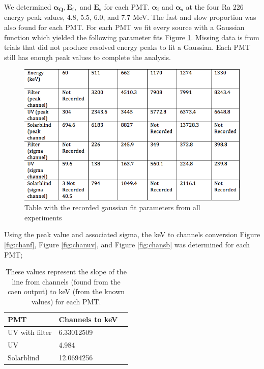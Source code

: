 \documentclass[aip, jmp, amsmath, amssymb, reprint, floatfix]{revtex4-1}
\begin{document}
We determined $\bm{\alpha_Q, E_f,}$ and $\bm{E_s}$ for each PMT. $\bm{\alpha_f}$ and $\bm{\alpha_s}$ at the four Ra 226 energy peak values, 4.8, 5.5, 6.0, and 7.7 MeV. The fast and slow proportion was also found for each PMT. For each PMT we fit every source with a Gaussian function which yielded the following parameter fits Figure \ref{fig:gaussfits}. Missing data is from trials that did not produce resolved energy peaks to fit a Gaussian. Each PMT still has enough peak values to complete the analysis. 

\begin{figure}
  \centering
    \includegraphics[width=.9\columnwidth]{gaussfits.png}
  \caption{Table with the recorded gaussian fit parameters from all experiments}
  \label{fig:gaussfits}
\end{figure} 

\noindent
Using the peak value and associated sigma, the keV to channels conversion Figure \ref{fig:chanf}, Figure \ref{fig:chanuv}, and Figure \ref{fig:chansb} was determined for each PMT; 

\begin{table}
    \begin{tabular}{ | l | l | p{2cm} |}
    \hline
    PMT & Channels to keV\\ \hline

    UV with filter & 6.33012509\\ \hline  

    UV & 4.984\\ \hline

    Solarblind & 12.0694256\\ \hline
    \hline
    \end{tabular}
    \caption{These values represent the slope of the line from channels (found from the caen output) to keV (from the known values) for each PMT.}
    \label{table:chan_kev}
\end{table}
\end{document}
